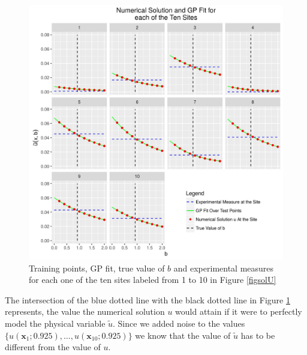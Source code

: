 \documentclass[12pt]{book}
\newcommand{\x}{\textbf{x}}
\begin{document}
%
%

\begin{figure}[H]
\centering
\includegraphics[scale=0.7]{./FigChap3/fitted}
\caption{Training points, GP fit, true value of $b$ and experimental measures for each one of the ten sites labeled
from 1 to 10 in Figure \ref{figsolU}}
\label{fignofitted}
\end{figure}

The intersection of the blue dotted line with the black dotted line in Figure \ref{fignofitted} represents, 
the value the numerical 
solution $u$  would attain  if it were to  perfectly model the physical variable $\tilde{u}$. 
Since we added noise to the values
$\{u(\x_{1};0.925),\ldots,u(\x_{10};0.925)\}$ we know that the value of $\tilde{u}$ has to be different 
from the value of $u$.
\newline
\end{document}
